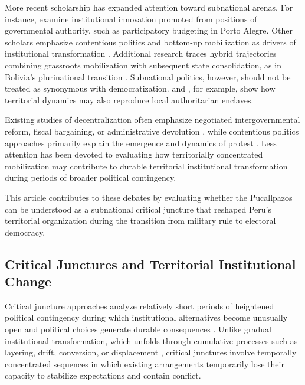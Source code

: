 \documentclass[12pt]{article}
\begin{document}
More recent scholarship has expanded attention toward subnational arenas. For instance, \textcite{abers_inventing_2000} examine institutional innovation promoted from positions of governmental authority, such as participatory budgeting in Porto Alegre. Other scholars emphasize contentious politics and bottom-up mobilization as drivers of institutional transformation \parencite{silva_challenging_2009,somma_renovando_2022}. Additional research traces hybrid trajectories combining grassroots mobilization with subsequent state consolidation, as in Bolivia’s plurinational transition \parencite{postero_indigenous_2017,leyva_solano_indigenismo_2005}. Subnational politics, however, should not be treated as synonymous with democratization. \textcite{gibson_boundary_2005} and \textcite{giraudy_politics_2010}, for example, show how territorial dynamics may also reproduce local authoritarian enclaves.

Existing studies of decentralization often emphasize negotiated intergovernmental reform, fiscal bargaining, or administrative devolution \parencite{falleti_decentralization_2010}, while contentious politics approaches primarily explain the emergence and dynamics of protest \parencite{mcadam_dynamics_2001}. Less attention has been devoted to evaluating how territorially concentrated mobilization may contribute to durable territorial institutional transformation during periods of broader political contingency.

This article contributes to these debates by evaluating whether the Pucallpazos can be understood as a subnational critical juncture that reshaped Peru’s territorial organization during the transition from military rule to electoral democracy.

\subsection{Critical Junctures and Territorial Institutional Change}

Critical juncture approaches analyze relatively short periods of heightened political contingency during which institutional alternatives become unusually open and political choices generate durable consequences \parencite{capoccia_study_2007,collier_critical_2022}. Unlike gradual institutional transformation, which unfolds through cumulative processes such as layering, drift, conversion, or displacement \parencite{streeck_introduction_2005}, critical junctures involve temporally concentrated sequences in which existing arrangements temporarily lose their capacity to stabilize expectations and contain conflict.
\end{document}
